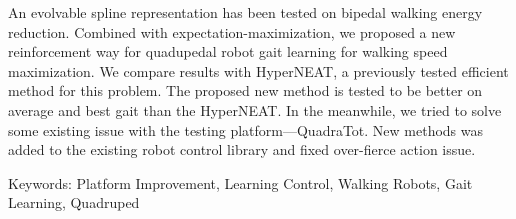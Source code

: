 An evolvable spline representation has been tested on bipedal walking energy reduction. 
Combined with expectation-maximization, we proposed a new reinforcement way for quadupedal robot gait learning for walking speed maximization. 
We compare results with HyperNEAT, a previously tested efficient 
method for this problem. The proposed new method is tested to be better on average and best gait than the HyperNEAT. In the meanwhile, we tried to solve some existing issue with the testing platform---QuadraTot. New methods was added to the existing 
robot control library and fixed over-fierce action issue. 

Keywords: Platform Improvement, Learning Control, Walking Robots, Gait Learning, Quadruped
